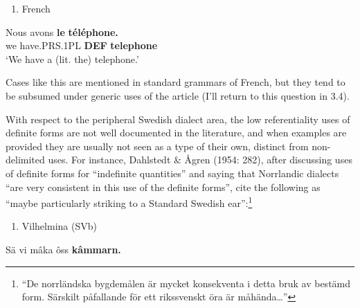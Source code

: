 \begin{enumerate} %
\item 
\label{bkm:Ref224102943}French
\end{enumerate} %
\ea\label{}
\gll Nous  avons  \textbf{le} \textbf{téléphone.}\\


we  have.PRS.1PL  \textbf{DEF} \textbf{telephone}\\ %


‘We have a (lit. the) telephone.’
\z


Cases like this are mentioned in standard grammars of French, but they tend to be subsumed under generic uses of the article (I’ll return to this question in 3.4). 

With respect to the peripheral Swedish dialect area, the low referentiality uses of definite forms are not well documented in the literature, and when examples are provided they are usually not seen as a type of their own, distinct from non-delimited uses. For instance, Dahlstedt \& Ågren (1954: 282), after discussing uses of definite forms for “indefinite quantities” and saying that Norrlandic dialects “are very consistent in this use of the definite forms”, cite the following as “maybe particularly striking to a Standard Swedish ear”:\footnote{ “De norrländska bygdemålen är mycket konsekventa i detta bruk av bestämd form. Särskilt påfallande för ett rikssvenskt öra är måhända…”} 

\begin{enumerate} %
\item 
Vilhelmina (SVb)

\end{enumerate} %
\ea\label{}
\gll Sä  vi  mâka  ôss  \textbf{kâmmarn.}\\


